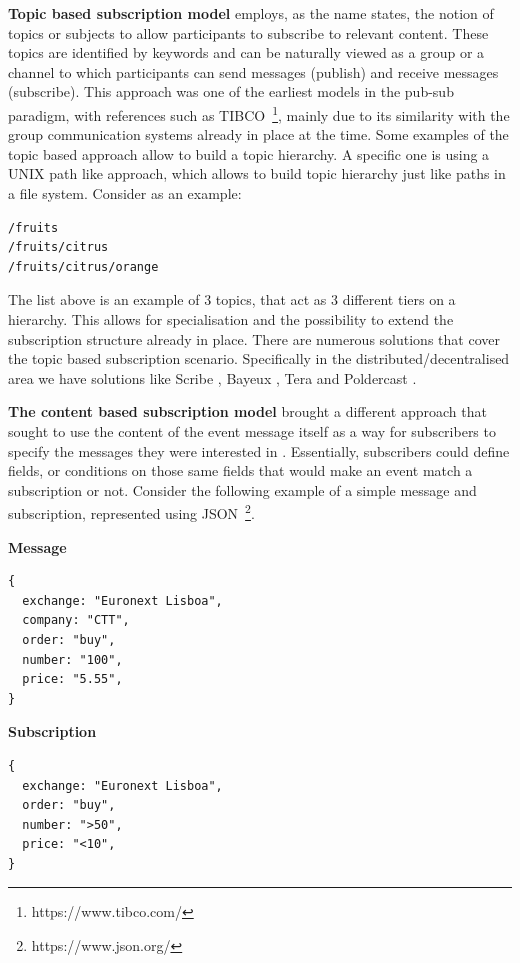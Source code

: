 \textbf{Topic based subscription model} employs, as the name states, the
notion of topics or subjects to allow participants to subscribe to
relevant content. These topics are identified by keywords and can be
naturally viewed as a group or a channel to which participants can send
messages (publish) and receive messages (subscribe). This approach was
one of the earliest models in the pub-sub paradigm, with references
such as TIBCO~\footnote{https://www.tibco.com/}, mainly due to its similarity with the group
communication systems already in place at the time. Some examples of the
topic based approach allow to build a topic hierarchy. A specific one is
using a UNIX path like approach, which allows to build topic hierarchy
just like paths in a file system. Consider as an example:

\begin{verbatim}
/fruits
/fruits/citrus
/fruits/citrus/orange
\end{verbatim}

The list above is an example of 3 topics, that act as 3 different tiers
on a hierarchy. This allows for specialisation and the possibility to
extend the subscription structure already in place. There are numerous
solutions that cover the topic based subscription scenario. Specifically
in the distributed/decentralised area we have solutions like Scribe \cite{Castro2002},
Bayeux \cite{Zhuang2001}, Tera \cite{Baldoni2007} and Poldercast \cite{Setty2012}.
\bigskip

\textbf{The content based subscription model} brought a different
approach that sought to use the content of the event message itself as a
way for subscribers to specify the messages they were interested in \cite{Banavar1999}.
Essentially, subscribers could define fields, or conditions on those same fields that would make an event
match a subscription or not. Consider the following example of a simple
message and subscription, represented using JSON~\footnote{https://www.json.org/}.
\bigskip

\textbf{Message}

\begin{verbatim}
{
  exchange: "Euronext Lisboa",
  company: "CTT",
  order: "buy",
  number: "100",
  price: "5.55",
}
\end{verbatim}

\textbf{Subscription}

\begin{verbatim}
{
  exchange: "Euronext Lisboa",
  order: "buy",
  number: ">50",
  price: "<10",
}
\end{verbatim}

